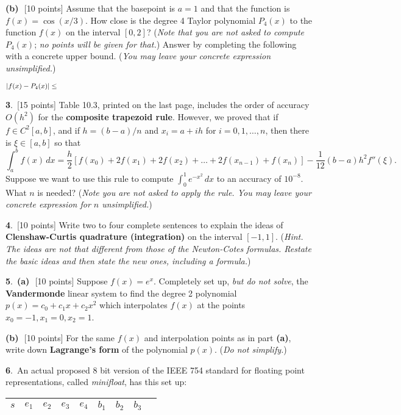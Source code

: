\documentclass[11pt]{amsart}
\newcommand{\prob}[1]{\bigskip\noindent\large\textbf{#1}.\,\normalsize }
\newcommand{\ppart}[1]{\textbf{(#1)}\,\, }
\newcommand{\epart}[1]{\medskip\noindent\textbf{(#1)}\,\, }
\newcommand{\pts}[1]{\scriptsize [#1 points] \normalsize}
\begin{document}
\epart{b} \pts{10}  Assume that the basepoint is $a=1$ and that the function is $f(x)=\cos(x/3)$.  How close is the degree 4 Taylor polynomial $P_4(x)$ to the function $f(x)$ on the interval $[0,2]$?  (\emph{Note that you are not asked to compute} $P_4(x)$; \emph{no points will be given for that.})  Answer by completing the following with a concrete upper bound.  (\emph{You may leave your concrete expression unsimplified.})

\bigskip
   $$|f(x) - P_4(x)| \le \hspace{5.0in}$$
\vfill


\newpage
\prob{3} \pts{15}  Table 10.3, printed on the last page, includes the order of accuracy $O(h^2)$ for the \textbf{composite trapezoid rule}.  However, we proved that if $f \in C^2[a,b]$, and if $h=(b-a)/n$ and $x_i = a+ih$ for $i=0,1,\dots,n$, then there is $\xi \in [a,b]$ so that
	$$\int_a^b f(x)\,dx = \frac{h}{2} \left[f(x_0) + 2 f(x_1) + 2 f(x_2) + \dots + 2 f(x_{n-1}) + f(x_n)\right] - \frac{1}{12} (b-a) h^2 f''(\xi).$$
Suppose we want to use this rule to compute $\int_0^1 e^{-x^2}\,dx$ to an accuracy of $10^{-8}$.  What $n$ is needed?  (\emph{Note you are not asked to apply the rule.  You may leave your concrete expression for $n$ unsimplified.})
\vfill

\prob{4} \pts{10}  Write two to four complete sentences to explain the ideas of \textbf{Clenshaw-Curtis quadrature (integration)} on the interval $[-1,1]$.  (\emph{Hint.  The ideas are not that different from those of the Newton-Cotes formulas.  Restate the basic ideas and then state the new ones, including a formula.})
\vspace{3.0in}


\newpage
\prob{5} \ppart{a} \pts{10}   Suppose $f(x) = e^x$.  Completely set up, \emph{but do not solve}, the \textbf{Vandermonde} linear system to find the degree 2 polynomial $p(x)=c_0+c_1x+c_2x^2$ which interpolates $f(x)$ at the points $x_0=-1,x_1=0,x_2=1$.
\vfill

\epart{b} \pts{10}  For the same $f(x)$ and interpolation points as in part \textbf{(a)}, write down \textbf{Lagrange's form} of the polynomial $p(x)$.   (\emph{Do not simplify.})
\vfill


\newpage
\prob{6} An actual proposed 8 bit version of the IEEE 754 standard for floating point representations, called \emph{minifloat}, has this set up:

\medskip\large
\begin{center}
\begin{tabular}{|c|c|c|c|c|c|c|c|c|} \hline
$s$ & $e_1$ & $e_2$ & $e_3$ & $e_4$ & $b_1$ & $b_2$ & $b_3$ \\ \hline
\end{tabular}
\end{center}
\medskip\normalsize
\end{document}
